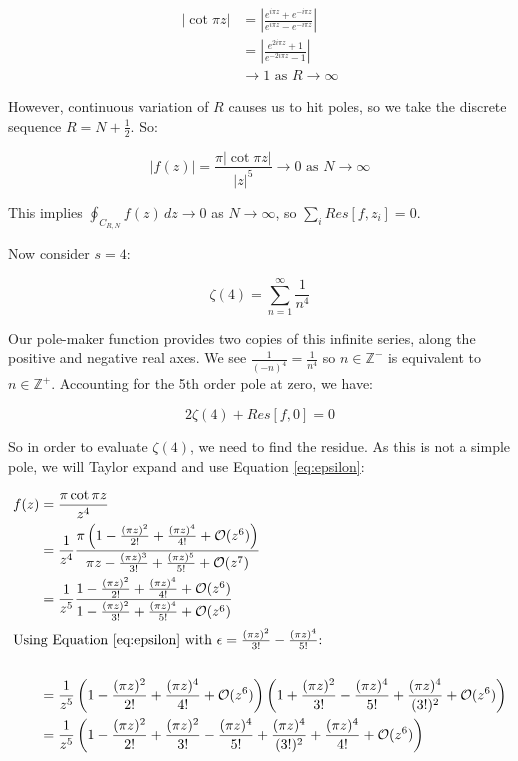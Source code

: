 \documentclass{../../physics_notes}
\begin{document}
\begin{align*}
|\cot{\pi z}| &= \left|\frac{e^{i\pi z} + e^{-i\pi z}}{e^{i\pi z} - e^{-i\pi z}}\right| \\
&= \left|\frac{e^{2i\pi z} + 1}{e^{-2i\pi z} - 1}\right| \\
&\to 1 \text{ as } R \to\infty
\end{align*}

However, continuous variation of $R$ causes us to hit poles, so we take the discrete sequence $R=N+\frac{1}{2}$. So:

\[ \left|f(z)\right| = \frac{\pi | \cot{\pi z} |}{|z|^5} \to 0 \text{ as } N \to \infty \]

This implies $\oint_{C_{R,N}} f(z)\, dz \to 0$ as $N\to\infty$, so $\sum_i Res[f,z_i] = 0$.

Now consider $s=4$:

\[ \zeta(4) = \sum_{n=1}^\infty \frac{1}{n^4} \]

Our pole-maker function provides two copies of this infinite series, along the positive and negative real axes. We see $\frac{1}{(-n)^4} = \frac{1}{n^4}$ so $n\in \mathbb{Z}^-$ is equivalent to $n\in \mathbb{Z}^+$. Accounting for the 5th order pole at zero, we have:

\[ 2\zeta(4) + Res[f,0] = 0 \]

So in order to evaluate $\zeta(4)$, we need to find the residue. As this is not a simple pole, we will Taylor expand and use Equation \ref{eq:epsilon}:

\begin{align*}
	f(z) &= \frac{\pi \cot{\pi z}}{z^4} \\
	&= \frac{1}{z^4} \frac{\pi \left(1 - \frac{(\pi z)^2}{2!} + \frac{(\pi z)^4}{4!} + \mathcal{O}(z^6)\right)}{\pi z - \frac{(\pi z)^3}{3!} + \frac{(\pi z)^5}{5!} + \mathcal{O}(z^7)} \\
	&= \frac{1}{z^5} \frac{1 - \frac{(\pi z)^2}{2!} + \frac{(\pi z)^4}{4!} + \mathcal{O}(z^6)}{1 - \frac{(\pi z)^2}{3!} + \frac{(\pi z)^4}{5!} + \mathcal{O}(z^6)} \\
	\intertext{Using Equation \ref{eq:epsilon} with $\epsilon = \frac{(\pi z)^2}{3!} - \frac{(\pi z)^4}{5!}$:} \\
	&= \frac{1}{z^5}\left(1 - \frac{(\pi z)^2}{2!} + \frac{(\pi z)^4}{4!} + \mathcal{O}(z^6)\right)\left(1 + \frac{(\pi z)^2}{3!} - \frac{(\pi z)^4}{5!} + \frac{(\pi z)^4}{(3!)^2} + \mathcal{O}(z^6)\right) \\
	&= \frac{1}{z^5}\left(1 - \frac{(\pi z)^2}{2!} + \frac{(\pi z)^2}{3!} - \frac{(\pi z)^4}{5!} + \frac{(\pi z)^4}{(3!)^2} + \frac{(\pi z)^4}{4!} + \mathcal{O}(z^6)\right)
\end{align*}
\end{document}
